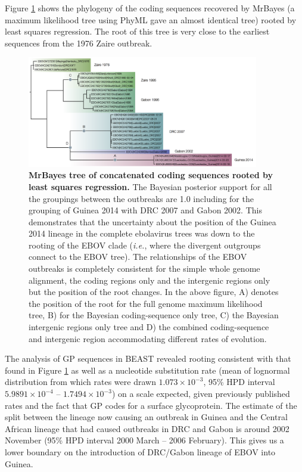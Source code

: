 \documentclass[11pt,oneside,letterpaper]{article}
\begin{document}
Figure \ref{MBtreePath} shows the phylogeny of the coding sequences recovered by MrBayes (a maximum likelihood tree using PhyML gave an almost identical tree) rooted by least squares regression.
The root of this tree is very close to the earliest sequences from the 1976 Zaire outbreak.

\begin{figure}[h!]
\centering  
\includegraphics[width=0.9\textwidth]  {figures/EBOV_cds_mb_rootedTree.png}
\caption{\textbf{MrBayes tree of concatenated coding sequences rooted by least squares regression.}
The Bayesian posterior support for all the groupings between the outbreaks are 1.0 including for the grouping of Guinea 2014 with DRC 2007 and Gabon 2002. This demonstrates that the uncertainty about the position of the Guinea 2014 lineage in the complete ebolavirus trees was down to the rooting of the EBOV clade (\textit{i.e.}, where the divergent outgroups connect to the EBOV tree). The relationships of the EBOV outbreaks is completely consistent for the simple whole genome alignment, the coding regions only and the intergenic regions only but the position of the root changes. In the above figure, A) denotes the position of the root for the full genome maximum likelihood tree, B) for the Bayesian coding-sequence only tree, C) the Bayesian intergenic regions only tree and D) the combined coding-sequence and intergenic region accommodating different rates of evolution.}
\label{MBtreePath}
\end{figure}

The analysis of GP sequences in BEAST revealed rooting consistent with that found in Figure \ref{MBtreePath} as well as a nucleotide substitution rate (mean of lognormal distribution from which rates were drawn $1.073\times10^{-3}$, 95\% HPD interval $5.9891\times10^{-4}$ -- $1.7494\times10^{-3}$) on a scale expected, given previously published rates \cite{carroll2013} and the fact that GP codes for a surface glycoprotein.
The estimate of the split between the lineage now causing an outbreak in Guinea and the Central African lineage that had caused outbreaks in DRC and Gabon is around 2002 November (95\% HPD interval 2000 March -- 2006 February).
This gives us a lower boundary on the introduction of DRC/Gabon lineage of EBOV into Guinea.
\end{document}
